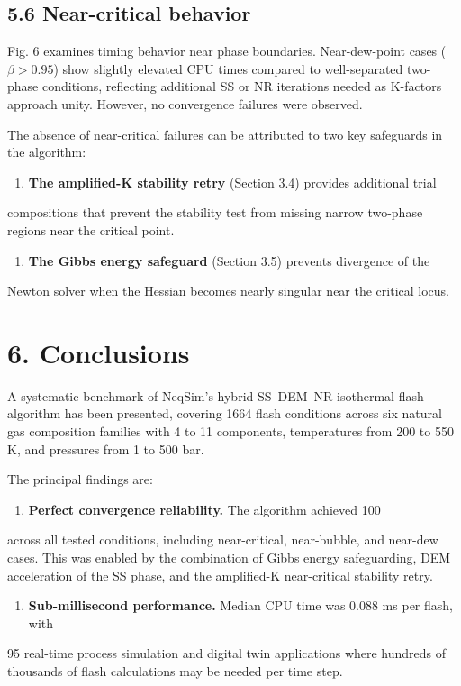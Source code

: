 \documentclass[review,3p]{custom}
\begin{document}
{\subsection{5.6 Near-critical behavior}

Fig. 6 examines timing behavior near phase boundaries. Near-dew-point cases
($\beta > 0.95$) show slightly elevated CPU times compared to well-separated
two-phase conditions, reflecting additional SS or NR iterations needed as K-factors
approach unity. However, no convergence failures were observed.

The absence of near-critical failures can be attributed to two key safeguards in
the algorithm:

\begin{enumerate}
  \item \textbf{The amplified-K stability retry} (Section 3.4) provides additional trial
\end{enumerate}
   compositions that prevent the stability test from missing narrow two-phase
   regions near the critical point.
\begin{enumerate}
  \item \textbf{The Gibbs energy safeguard} (Section 3.5) prevents divergence of the
\end{enumerate}
   Newton solver when the Hessian becomes nearly singular near the critical locus.


\section{6. Conclusions}

A systematic benchmark of NeqSim's hybrid SS–DEM–NR isothermal flash algorithm
has been presented, covering 1664 flash conditions across six natural gas composition
families with 4 to 11 components, temperatures from 200 to 550 K, and pressures
from 1 to 500 bar.

The principal findings are:

\begin{enumerate}
  \item \textbf{Perfect convergence reliability.} The algorithm achieved 100%
\end{enumerate}
   across all tested conditions, including near-critical, near-bubble, and near-dew
   cases. This was enabled by the combination of Gibbs energy safeguarding, DEM
   acceleration of the SS phase, and the amplified-K near-critical stability retry.

\begin{enumerate}
  \item \textbf{Sub-millisecond performance.} Median CPU time was 0.088 ms per flash, with
\end{enumerate}
   95%
   real-time process simulation and digital twin applications where hundreds of
   thousands of flash calculations may be needed per time step.

}
\end{document}
